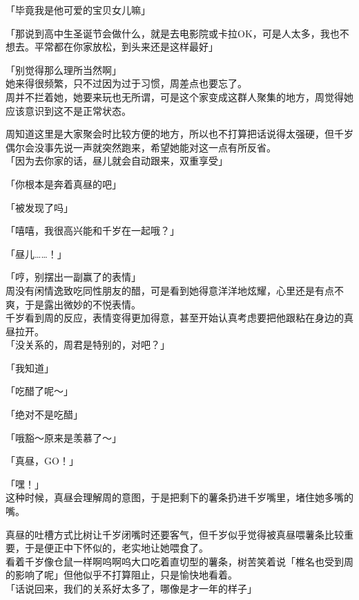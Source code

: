 「毕竟我是他可爱的宝贝女儿嘛」

「那说到高中生圣诞节会做什么，就是去电影院或卡拉OK，可是人太多，我也不想去。平常都在你家放松，到头来还是这样最好」

「别觉得那么理所当然啊」\\

她来得很频繁，只不过因为过于习惯，周差点也要忘了。\\

周并不拦着她，她要来玩也无所谓，可是这个家变成这群人聚集的地方，周觉得她应该意识到这不是正常状态。

周知道这里是大家聚会时比较方便的地方，所以也不打算把话说得太强硬，但千岁偶尔会没事先说一声就突然跑来，希望她能对这一点有所反省。\\

「因为去你家的话，昼儿就会自动跟来，双重享受」

「你根本是奔着真昼的吧」

「被发现了吗」

「嘻嘻，我很高兴能和千岁在一起哦？」

「昼儿……！」

「哼，别摆出一副赢了的表情」\\

周没有闲情逸致吃同性朋友的醋，可是看到她得意洋洋地炫耀，心里还是有点不爽，于是露出微妙的不悦表情。\\

千岁看到周的反应，表情变得更加得意，甚至开始认真考虑要把他跟粘在身边的真昼拉开。\\

「没关系的，周君是特别的，对吧？」

「我知道」

「吃醋了呢～」

「绝对不是吃醋」

「哦豁～原来是羡慕了～」

「真昼，GO！」

「嘿！」\\

这种时候，真昼会理解周的意图，于是把剩下的薯条扔进千岁嘴里，堵住她多嘴的嘴。

真昼的吐槽方式比树让千岁闭嘴时还要客气，但千岁似乎觉得被真昼喂薯条比较重要，于是便正中下怀似的，老实地让她喂食了。\\

看着千岁像仓鼠一样啊呜啊呜大口吃着直切型的薯条，树苦笑着说「椎名也受到周的影响了呢」但他似乎不打算阻止，只是愉快地看着。\\

「话说回来，我们的关系好太多了，哪像是才一年的样子」

